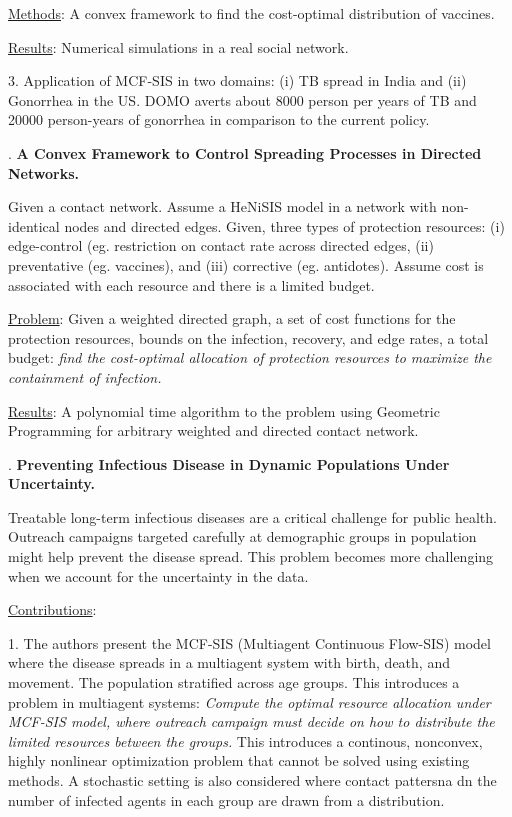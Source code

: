 \begin{enumerate}
\smallskip
\noindent
\underline{Methods}: A convex framework to find the cost-optimal distribution of vaccines.

\smallskip
\noindent
\underline{Results}: Numerical simulations in a real social network.

3. Application of MCF-SIS in two domains: (i) TB spread in India and (ii) Gonorrhea in the US. DOMO averts about 8000 person per years of TB and 20000 person-years of gonorrhea in comparison to the current policy.

\medskip
{}. \textbf{A Convex Framework to Control Spreading Processes in Directed Networks.} \cite{PreciadoVM13_2}

\smallskip
\noindent
Given a contact network. Assume a HeNiSIS model in a network with non-identical nodes and directed edges. Given, three types of protection resources: (i) edge-control (eg. restriction on contact rate across directed edges, (ii) preventative (eg. vaccines), and (iii) corrective (eg. antidotes). Assume cost is associated with each resource and there is a limited budget.

\smallskip
\noindent
\underline{Problem}: Given a weighted directed graph, a set of cost functions for the protection resources, bounds on the infection, recovery, and edge rates, a total budget: \textit{find the cost-optimal allocation of protection resources to maximize the containment of infection.}

\smallskip
\noindent
\underline{Results}: A polynomial time algorithm to the problem using Geometric Programming for arbitrary weighted and directed contact network.

\medskip
{}. \textbf{Preventing Infectious Disease in Dynamic Populations Under Uncertainty.} \cite{AAAI1816714}

Treatable long-term infectious diseases are a critical challenge for public health. Outreach campaigns targeted carefully at demographic groups in population might help prevent the disease spread. This problem becomes more challenging when we account for the uncertainty in the data. 

\smallskip
\noindent
\underline{Contributions}:

1. The authors present the MCF-SIS (Multiagent Continuous Flow-SIS) model where the disease spreads in a multiagent system with birth, death, and movement. The population stratified across age groups. This introduces a problem in multiagent systems: \textit{Compute the optimal resource allocation under MCF-SIS model, where outreach campaign must decide on how to distribute the limited resources between the groups.} This introduces a continous, nonconvex, highly nonlinear optimization problem that cannot be solved using existing methods. A stochastic setting is also considered where contact pattersna dn the number of infected agents in each group are drawn from a distribution.


\end{enumerate}
